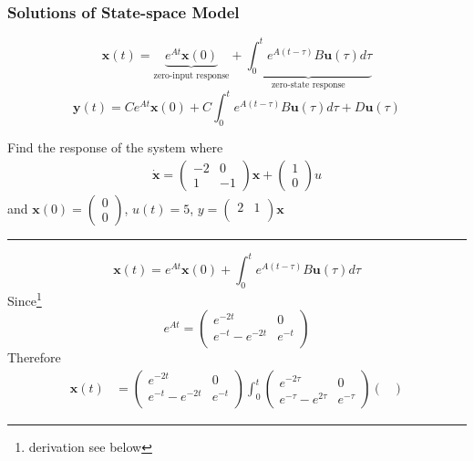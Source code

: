 \subsubsection{Solutions of State-space Model}
\[\mathbf{x}(t) = \underbrace{e^{At}\mathbf{x}(0)}_{\text{zero-input response}}+\underbrace{\int_{0}^{t}e^{A(t-\tau)}B\mathbf{u}(\tau)d\tau}_{\text{zero-state response}}\]
\[\mathbf{y}(t) = Ce^{At}\mathbf{x}(0)+C\int_{0}^{t}e^{A(t-\tau)}B\mathbf{u}(\tau)d\tau+D\mathbf{u}(\tau)\]

\begin{ex}{}
Find the response of the system where 
\begin{gather*}
\mathbf{\dot{x}}=\begin{pmatrix} -
2&0\\
1&-1
\end{pmatrix}
\mathbf{x}+
\begin{pmatrix}
1\\0
\end{pmatrix}u
\end{gather*}
and $\mathbf{x}(0)=\begin{pmatrix} 0\\0 \end{pmatrix}$, $u(t)=5$, $y =\begin{pmatrix}
2&1\\
\end{pmatrix}
 \mathbf{x}$
\vspace{.2cm}\hrule
\[\mathbf{x}(t) = e^{At}\mathbf{x}(0)+\int_{0}^{t}e^{A(t-\tau)}B\mathbf{u}(\tau)d\tau\]
Since\footnote{derivation see below}
\[e^{At} = \begin{pmatrix}
e^{-2t} & 0\\
e^{-t}-e^{-2t} & e^{-t}\\
\end{pmatrix}
\]
Therefore
\begin{equation*}
\begin{aligned}
\mathbf{x}(t) &= \begin{pmatrix}
e^{-2t} & 0\\
e^{-t}-e^{-2t} & e^{-t}\\
\end{pmatrix}
\int^{t}_{0}
\begin{pmatrix}
e^{-2\tau} & 0\\
e^{-\tau}-e^{2\tau} & e^{-\tau}
\end{pmatrix}
\begin{pmatrix}

\end{pmatrix}
\end{aligned}
\end{equation*}
\end{ex}
